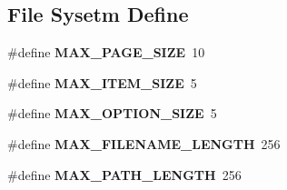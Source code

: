 \subsection*{File Sysetm Define}
\begin{DoxyCompactItemize}
\item 
\mbox{\label{group__MODULE__FILE__SYSTEM_ga7c4410712a9f7874ae814e10ebbc3f5b}} 
\#define {\bfseries M\+A\+X\+\_\+\+P\+A\+G\+E\+\_\+\+S\+I\+ZE}~10
\item 
\mbox{\label{group__MODULE__FILE__SYSTEM_ga0b0dc907dfd588df63511d6dd1584f3e}} 
\#define {\bfseries M\+A\+X\+\_\+\+I\+T\+E\+M\+\_\+\+S\+I\+ZE}~5
\item 
\mbox{\label{group__MODULE__FILE__SYSTEM_gadfa24d79f2c854014012db924060062f}} 
\#define {\bfseries M\+A\+X\+\_\+\+O\+P\+T\+I\+O\+N\+\_\+\+S\+I\+ZE}~5
\item 
\mbox{\label{group__MODULE__FILE__SYSTEM_ga6773b93f3093658c3dcb569de3b4bdb2}} 
\#define {\bfseries M\+A\+X\+\_\+\+F\+I\+L\+E\+N\+A\+M\+E\+\_\+\+L\+E\+N\+G\+TH}~256
\item 
\mbox{\label{group__MODULE__FILE__SYSTEM_ga9eb6992d76f02128388ae95c0415604a}} 
\#define {\bfseries M\+A\+X\+\_\+\+P\+A\+T\+H\+\_\+\+L\+E\+N\+G\+TH}~256
\end{DoxyCompactItemize}

